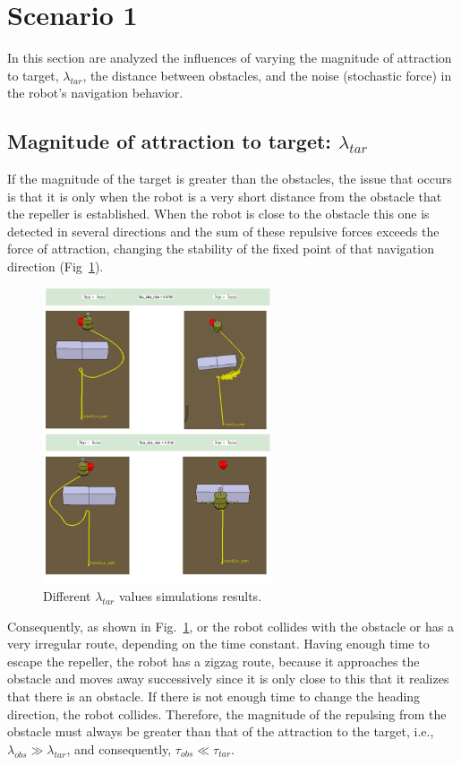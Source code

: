 \section{Scenario 1}%
\label{obst-tar-nonlinear-scenario1}
In this section are analyzed the influences of varying the magnitude of
attraction to target, $\lambda_{tar}$, the distance between obstacles, and the noise
(stochastic force) in the robot's navigation behavior.

\subsection{Magnitude of attraction to target: $\lambda_{tar}$}%
\label{obst-tar-nonlinear-lambda-tar}
If the magnitude of the target is greater than the obstacles, the
issue that occurs is that it is only when the robot is a very short distance
from the obstacle that the repeller is established. When the robot is close to
the obstacle this one is detected in several directions and the sum of these
repulsive forces exceeds the force of attraction, changing the stability of the
fixed point of that navigation direction (Fig~\ref{fig:obs-tar-nonlinear-different-lambda}).
%
\begin{figure}[htb!]
  \centering
  \includegraphics[width=0.6\textwidth]{img/ytar.png}
  \caption{Different $\lambda_{tar}$ values simulations results.}%
  \label{fig:obs-tar-nonlinear-different-lambda}
\end{figure}

Consequently, as shown in Fig.~\ref{fig:obs-tar-nonlinear-different-lambda}, or the robot collides with the obstacle or has a very irregular route, depending on the time constant. Having enough time to escape the repeller, the robot has a zigzag route, because it approaches the obstacle and moves away successively since it is only close to this that it realizes that there is an obstacle. If there is not enough time to change the heading direction, the robot collides.
Therefore, the magnitude of the repulsing from the obstacle must always be
greater than that of the attraction to
the target, i.e., 
$\lambda_{obs} \gg \lambda_{tar}$, and consequently, $\tau_{obs} \ll \tau_{tar}$.
%
